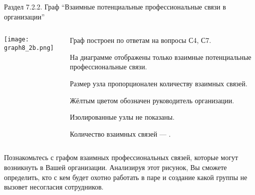 \begin{frame}{Раздел 7.2.2. Граф ``Взаимные потенциальные профессиональные связи в организации''}

\begin{columns} 
\begin{column}{0.7\textwidth}
\centering
          \texttt{[image: graph8\_2b.png]}
\end{column}
\begin{column}{0.25\textwidth} 

\tiny
Граф  построен по ответам на вопросы С4, С7.
\smallskip

На диаграмме отображены только взаимные потенциальные профессиональные связи.
\smallskip

Размер узла пропорционален количеству взаимных связей.
\smallskip

Жёлтым цветом обозначен руководитель организации.
\smallskip

Изолированные узлы не показаны.
\bigskip

Количество взаимных связей --- \valHBBlinks.


\end{column}
\end{columns}

\fontsize{6pt}{7}\selectfont
Познакомьтесь с графом взаимных профессиональных связей, которые могут возникнуть в Вашей организации. 
Анализируя этот рисунок, Вы сможете определить, кто с кем будет охотно работать в паре и 
создание какой группы не вызовет несогласия сотрудников. 


\end{frame}


